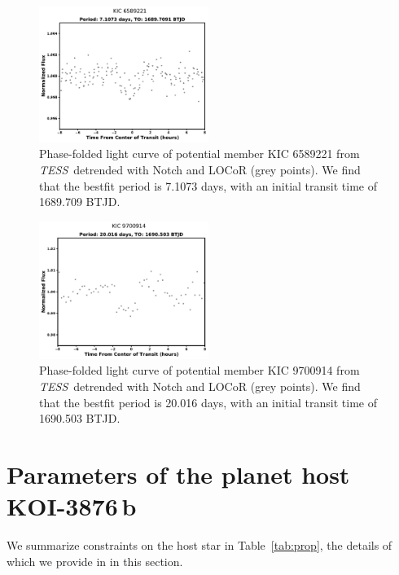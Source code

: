\documentclass[twocolumn]{aastex631}
\newcommand{\planetname}{KOI-3876\,b}
\newcommand{\tess}{\textit{TESS}}
\begin{document}
\begin{figure}[tb]
    \centering
    \includegraphics[width=0.49\textwidth]{KIC6589221LC.pdf}
    \caption{Phase-folded light curve of potential member KIC 6589221 from \tess\ detrended with Notch and LOCoR (grey points). We find that the bestfit period is 7.1073 days, with an initial transit time of 1689.709 BTJD. }
    \label{fig:kic221transit}
\end{figure}

\begin{figure}[tb]
    \centering
    \includegraphics[width=0.49\textwidth]{KIC9700914LC.pdf}
    \caption{Phase-folded light curve of potential member KIC 9700914 from \tess\ detrended with Notch and LOCoR (grey points). We find that the bestfit period is 20.016 days, with an initial transit time of 1690.503 BTJD. }
    \label{fig:kic914transit}
\end{figure}


\section{Parameters of the planet host \planetname}\label{sec:stellar_params}

We summarize constraints on the host star in Table~\ref{tab:prop}, the details of which we provide in in this section. 
\end{document}
